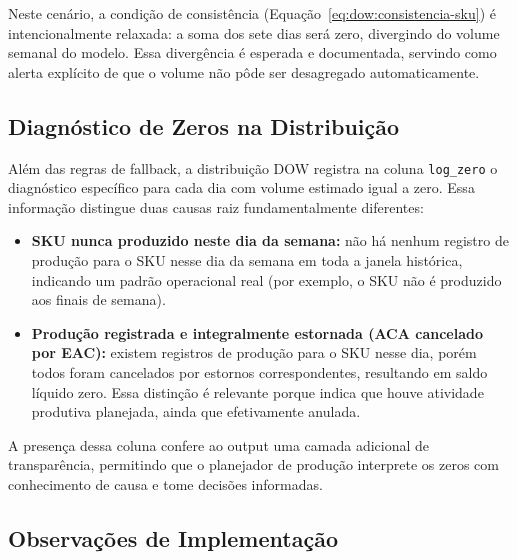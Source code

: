 \documentclass[11pt,a4paper]{article}
\begin{document}
Neste cenário, a condição de consistência
(Equação~\eqref{eq:dow:consistencia-sku}) é intencionalmente relaxada: a soma
dos sete dias será zero, divergindo do volume semanal do modelo. Essa
divergência é esperada e documentada, servindo como alerta explícito de que o
volume não pôde ser desagregado automaticamente.

\subsection{Diagnóstico de Zeros na Distribuição}

Além das regras de fallback, a distribuição DOW registra na coluna
\texttt{log\_zero} o diagnóstico específico para cada dia com volume estimado
igual a zero. Essa informação distingue duas causas raiz fundamentalmente
diferentes:
\begin{itemize}
    \item \textbf{SKU nunca produzido neste dia da semana:} não há nenhum
        registro de produção para o SKU nesse dia da semana em toda a janela
        histórica, indicando um padrão operacional real (por exemplo, o SKU
        não é produzido aos finais de semana).
    \item \textbf{Produção registrada e integralmente estornada (ACA cancelado
        por EAC):} existem registros de produção para o SKU nesse dia, porém
        todos foram cancelados por estornos correspondentes, resultando em
        saldo líquido zero. Essa distinção é relevante porque indica que houve
        atividade produtiva planejada, ainda que efetivamente anulada.
\end{itemize}

A presença dessa coluna confere ao output uma camada adicional de
transparência, permitindo que o planejador de produção interprete os zeros
com conhecimento de causa e tome decisões informadas.

\subsection{Observações de Implementação}
\end{document}

